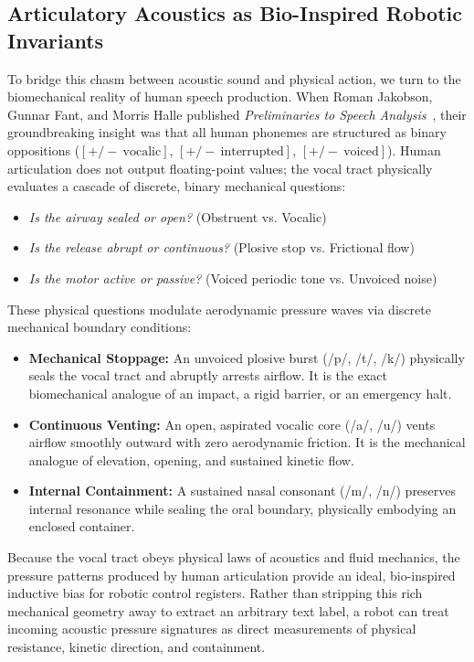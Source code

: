 \documentclass[journal,twocolumn]{IEEEtran}
\begin{document}
\subsection{Articulatory Acoustics as Bio-Inspired Robotic Invariants}
To bridge this chasm between acoustic sound and physical action, we turn to the biomechanical reality of human speech production. When Roman Jakobson, Gunnar Fant, and Morris Halle published \emph{Preliminaries to Speech Analysis}~\cite{jakobson1951}, their groundbreaking insight was that all human phonemes are structured as binary oppositions ($[+/-\ \text{vocalic}]$, $[+/-\ \text{interrupted}]$, $[+/-\ \text{voiced}]$). Human articulation does not output floating-point values; the vocal tract physically evaluates a cascade of discrete, binary mechanical questions:
\begin{itemize}
    \item \emph{Is the airway sealed or open?} (Obstruent vs. Vocalic)
    \item \emph{Is the release abrupt or continuous?} (Plosive stop vs. Frictional flow)
    \item \emph{Is the motor active or passive?} (Voiced periodic tone vs. Unvoiced noise)
\end{itemize}

These physical questions modulate aerodynamic pressure waves via discrete mechanical boundary conditions:
\begin{itemize}
    \item \textbf{Mechanical Stoppage:} An unvoiced plosive burst (/p/, /t/, /k/) physically seals the vocal tract and abruptly arrests airflow. It is the exact biomechanical analogue of an impact, a rigid barrier, or an emergency halt.
    \item \textbf{Continuous Venting:} An open, aspirated vocalic core (/a/, /u/) vents airflow smoothly outward with zero aerodynamic friction. It is the mechanical analogue of elevation, opening, and sustained kinetic flow.
    \item \textbf{Internal Containment:} A sustained nasal consonant (/m/, /n/) preserves internal resonance while sealing the oral boundary, physically embodying an enclosed container.
\end{itemize}

Because the vocal tract obeys physical laws of acoustics and fluid mechanics, the pressure patterns produced by human articulation provide an ideal, bio-inspired inductive bias for robotic control registers. Rather than stripping this rich mechanical geometry away to extract an arbitrary text label, a robot can treat incoming acoustic pressure signatures as direct measurements of physical resistance, kinetic direction, and containment.
\end{document}
